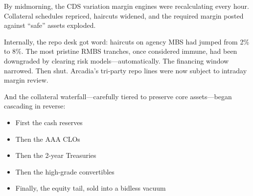 \medskip

By midmorning, the CDS variation margin engines were recalculating every hour.
Collateral schedules repriced, haircuts widened, and the required margin posted against “safe” assets exploded.

Internally, the repo desk got word: haircuts on agency MBS had jumped from 2\% to 8\%.
The most pristine RMBS tranches, once considered immune, had been downgraded by clearing risk models—automatically.
The financing window narrowed. Then shut.
Arcadia’s tri-party repo lines were now subject to intraday margin review.

And the collateral waterfall—carefully tiered to preserve core assets—began cascading in reverse:

\begin{itemize}
  \item First the cash reserves
  \item Then the AAA CLOs
  \item Then the 2-year Treasuries
  \item Then the high-grade convertibles
  \item Finally, the equity tail, sold into a bidless vacuum
\end{itemize}

\medskip


